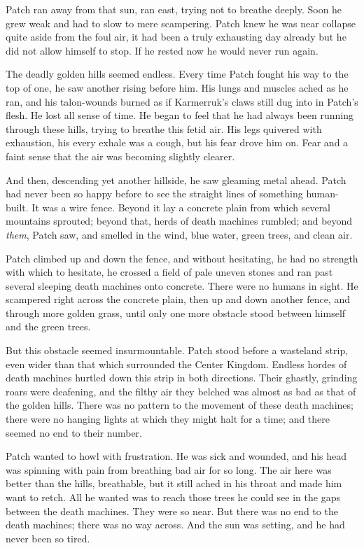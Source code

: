 \documentclass[12pt]{book}
\begin{document}
Patch ran away from that sun, ran east, trying not to breathe deeply. Soon he grew weak and had to slow to mere scampering. Patch knew he was near collapse %
 quite aside from the foul air, it had been a truly exhausting day already %
 but he did not allow himself to stop. If he rested now he would never run again.\par
The deadly golden hills seemed endless. Every time Patch fought his way to the top of one, he saw another rising before him. His lungs and muscles ached as he ran, and his talon-wounds burned as if Karmerruk's claws still dug into in Patch's flesh. He lost all sense of time. He began to feel that he had always been running through these hills, trying to breathe this fetid air. His legs quivered with exhaustion, his every exhale was a cough, but his fear drove him on. Fear %
 and a faint sense that the air was becoming slightly clearer.\par
And then, descending yet another hillside, he saw gleaming metal ahead. Patch had never been so happy before to see the straight lines of something human-built. It was a wire fence. Beyond it lay a concrete plain from which several mountains sprouted; beyond that, herds of death machines rumbled; and beyond {\it them}, Patch saw, and smelled in the wind, blue water, green trees, and clean air.\par
Patch climbed up and down the fence, and without hesitating, he had no strength with which to hesitate, he crossed a field of pale uneven stones and ran past several sleeping death machines onto concrete. There were no humans in sight. He scampered right across the concrete plain, then up and down another fence, and through more golden grass, until only one more obstacle stood between himself and the green trees.\par
But this obstacle seemed insurmountable. Patch stood before a wasteland strip, even wider than that which surrounded the Center Kingdom. Endless hordes of death machines hurtled down this strip in both directions. Their ghastly, grinding roars were deafening, and the filthy air they belched was almost as bad as that of the golden hills. There was no pattern to the movement of these death machines; there were no hanging lights at which they might halt for a time; and there seemed no end to their number.\par
 Patch wanted to howl with frustration. He was sick and wounded, and his head was spinning with pain from breathing bad air for so long. The air here was better than the hills, breathable, but it still ached in his throat and made him want to retch. All he wanted was to reach those trees he could see in the gaps between the death machines. They were so near. But there was no end to the death machines; there was no way across. And the sun was setting, and he had never been so tired.\par
\end{document}
